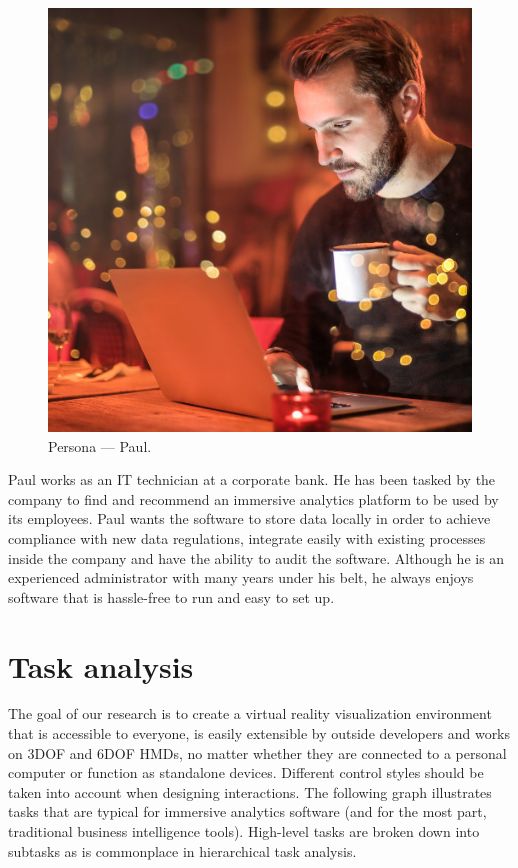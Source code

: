 \documentclass[thesis=M,english,hidelinks]{FITthesisXE}[2012/06/26]
\begin{document}
\begin{figure}[ht]
\centering
\includegraphics[scale=0.15]{persona_paul}
\caption{Persona --- Paul.}
\label{fig:persona_paul}
\end{figure}

Paul works as an IT technician at a corporate bank. He has been tasked by the company to find and recommend an immersive analytics platform to be used by its employees. Paul wants the software to store data locally in order to achieve compliance with new data regulations, integrate easily with existing processes inside the company and have the ability to audit the software. Although he is an experienced administrator with many years under his belt, he always enjoys software that is hassle-free to run and easy to set up.

\section{Task analysis}

The goal of our research is to create a virtual reality visualization environment that is accessible to everyone, is easily extensible by outside developers and works on 3DOF and 6DOF HMDs, no matter whether they are connected to a personal computer or function as standalone devices. Different control styles should be taken into account when designing interactions. The following graph illustrates tasks that are typical for immersive analytics software (and for the most part, traditional business intelligence tools). High-level tasks are broken down into subtasks as is commonplace in hierarchical task analysis.\autocite{hta}
\end{document}
